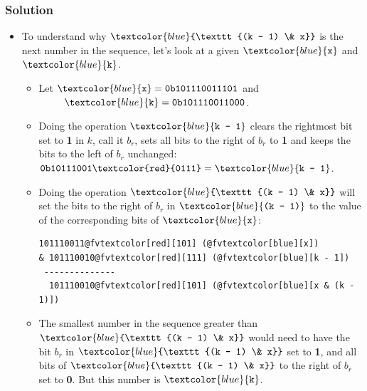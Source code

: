\documentclass{beamer}
\begin{document}
\begin{frame}[fragile]
\frametitle{Solution}

\footnotesize

\begin{itemize}

\item To understand why $\textcolor{blue}{\texttt{(k - 1) \& x}}$ is the next number in the sequence, let's look at a given $\textcolor{blue}{\texttt{x}}$ and
$\textcolor{blue}{\texttt{k}}$.
\begin{itemize}
\footnotesize
\item<1-> Let $\textcolor{blue}{\texttt{x}} = \texttt{0b101110011101}$ and\\
\ \ \ \ \ $\textcolor{blue}{\texttt{k}} = \texttt{0b101110011000}$.

\vspace{0.15cm}

\item<2-> Doing the operation $\textcolor{blue}{\texttt{k - 1}}$ clears the rightmost bit set to \textbf{1} in $k$, call it $b_r$,
sets all bits to the right of $b_r$ to \textbf{1} and
keeps the bits to the left of $b_r$ unchanged:
{$\texttt{0b10111001\textcolor{red}{0111}} = \textcolor{blue}{\texttt{k - 1}}$}.

\vspace{0.15cm}

\item<5-> Doing the operation $\textcolor{blue}{\texttt{(k - 1) \& x}}$ will set the bits to the right of $b_r$ in $\textcolor{blue}{\texttt{(k - 1)}}$
to the value of the corresponding bits of $\textcolor{blue}{\texttt{x}}$:\\
\vspace{0.05cm}
\begin{center}
\begin{BVerbatim}[commandchars=@\[\]]
  101110011@fvtextcolor[red][101] (@fvtextcolor[blue][x])
& 101110010@fvtextcolor[red][111] (@fvtextcolor[blue][k - 1])
 --------------
  101110010@fvtextcolor[red][101] (@fvtextcolor[blue][x & (k - 1)])
\end{BVerbatim}
\end{center}

\vspace{0.15cm}

\item<6-> The smallest number in the sequence greater than
$\textcolor{blue}{\texttt{(k - 1) \& x}}$ would need to have the bit $b_r$ in $\textcolor{blue}{\texttt{(k - 1) \& x}}$
set to \textbf{1}, and all bits of $\textcolor{blue}{\texttt{(k - 1) \& x}}$ to the right of $b_r$ set to \textbf{0}. But this number is $\textcolor{blue}{\texttt{k}}$.
\end{itemize}

\end{itemize}

\end{frame}
\end{document}
